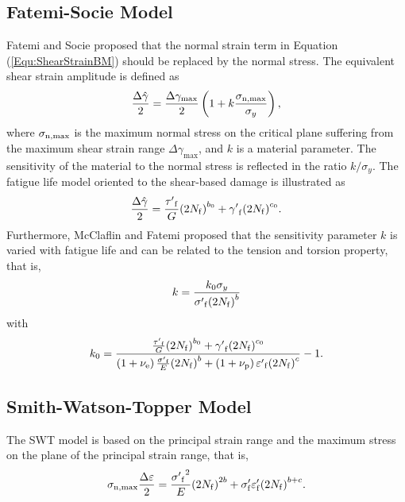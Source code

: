 \documentclass[preprint,5p,twocolumn,11pt,sort&compress]{elsarticle}
\begin{document}
\subsection{Fatemi-Socie Model}
Fatemi and Socie \cite{Fatemi1988} proposed that the normal strain term in Equation (\ref{Equ:ShearStrainBM}) should be replaced by the normal stress.
The equivalent shear strain amplitude is defined as
\begin{equation}
\frac{{\Delta \hat \gamma }}{2} = \frac{{\Delta {\gamma _{\max }}}}{2}\left( {1 + k\frac{{{\sigma _{\rm n,\max}}}}{{{\sigma _y}}}} \right),
\end{equation}
where
$\sigma _{\rm n,\max}$ is the maximum normal stress on the critical plane suffering from the maximum shear strain range $\Delta {\gamma _{\max}}$, and $k$ is a material parameter. The sensitivity of the material to the normal stress is reflected in the ratio $k/\sigma_y$.
The fatigue life model oriented to the shear-based damage is illustrated as
\begin{equation}
\frac{{\Delta \hat \gamma }}{2} = \frac{{{{\tau '}_{\rm f}}}}{G}{\left( {2{N_{\rm f}}} \right)^{{b_0}}} + {{\gamma '}_{\rm f}}{\left( {2{N_{\rm f}}} \right)^{{c_0}}}.
\end{equation}
Furthermore, McClaflin and Fatemi \cite{McClaflin2004} proposed that the sensitivity parameter $k$ is varied with fatigue life and can be related to the tension and torsion property, that is,
\begin{equation}
k =  \frac{{k_0 {\sigma _y}}}{{{{\sigma '}_{\rm f}}{{\left( {2{N_{\rm f}}} \right)}^b}}}
\end{equation}
with
\[
k_0 =  {\frac{{\frac{{{{\tau '}_{\rm f}}}}{G}{{\left( {2{N_{\rm f}}} \right)}^{{b_0}}} + {{\gamma '}_{\rm f}}{{\left( {2{N_{\rm f}}} \right)}^{{c_0}}}}}{{\left( {1 + {\nu _{\rm e}}} \right)\frac{{{{\sigma '}_{\rm f}}}}{E}{{\left( {2{N_{\rm f}}} \right)}^b} + \left( {1 + {\nu _{\rm p}}} \right){{\varepsilon '}_{\rm f}}{{\left( {2{N_{\rm f}}} \right)}^c}}} - 1} .
\]


\subsection{Smith-Watson-Topper Model}
The SWT model  \cite{Socie2000} is based on the principal strain range and the maximum stress on the plane of the principal
strain range, that is,
\[
{\sigma _{\rm n, \max}}\frac{{\Delta \varepsilon }}{2} = \frac{{{{\sigma '}_{\rm f}}^2}}{E}{\left( {2{N_{\rm f}}} \right)^{2b}} + {\sigma '_{\rm f}}{\varepsilon '_{\rm f}}{\left( {2{N_{\rm f}}} \right)^{b + c}}.
\]
\end{document}
